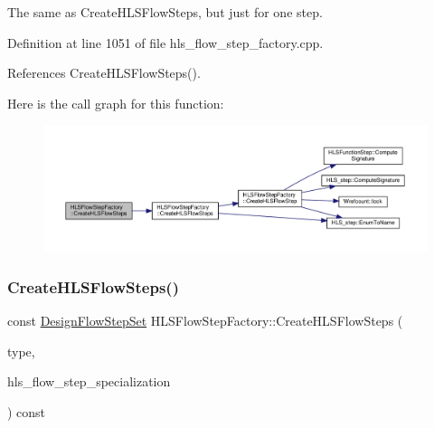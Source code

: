 The same as Create\+H\+L\+S\+Flow\+Steps, but just for one step. 



Definition at line 1051 of file hls\+\_\+flow\+\_\+step\+\_\+factory.\+cpp.



References Create\+H\+L\+S\+Flow\+Steps().

Here is the call graph for this function\+:
\nopagebreak
\begin{figure}[H]
\begin{center}
\leavevmode
\includegraphics[width=350pt]{dd/d39/classHLSFlowStepFactory_a67751f9e519fe68cad94fd61d08a02f8_cgraph}
\end{center}
\end{figure}
\mbox{\label{classHLSFlowStepFactory_a5ee886e0907aa696026b6b222ac3507f}} 
\subsubsection{\texorpdfstring{Create\+H\+L\+S\+Flow\+Steps()}{CreateHLSFlowSteps()}\hspace{0.1cm}{\footnotesize\ttfamily [3/3]}}
{\footnotesize\ttfamily const \hyperlink{classDesignFlowStepSet}{Design\+Flow\+Step\+Set} H\+L\+S\+Flow\+Step\+Factory\+::\+Create\+H\+L\+S\+Flow\+Steps (\begin{DoxyParamCaption}\item[{const \hyperlink{hls__step_8hpp_ada16bc22905016180e26fc7e39537f8d}{H\+L\+S\+Flow\+Step\+\_\+\+Type}}]{type,  }\item[{const \hyperlink{hls__step_8hpp_a5fdd2edf290c196531d21d68e13f0e74}{H\+L\+S\+Flow\+Step\+Specialization\+Const\+Ref}}]{hls\+\_\+flow\+\_\+step\+\_\+specialization }\end{DoxyParamCaption}) const}



